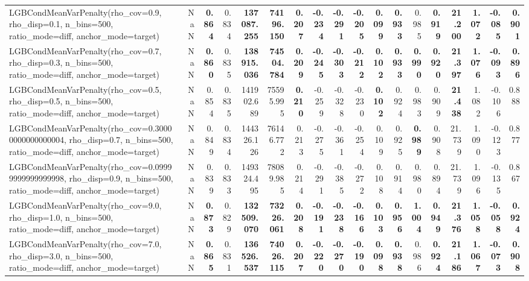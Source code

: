 \documentclass[11pt]{article}
\theoremstyle{plain}
\theoremstyle{definition}
\newcommand{\1}{\mathbf{1}}
\begin{document}
\begin{table}[htbp]
{\begin{tabular}{lrrrrrrrrrrrrrrrrr}
LGBCondMeanVarPenalty(rho\_cov=0.9, rho\_disp=0.1, n\_bins=500, ratio\_mode=diff, anchor\_mode=target) & NaN & \textbf{0.864} & 0.834 & \textbf{137087.255} & \textbf{74196.150} & \textbf{0.207} & \textbf{-0.234} & \textbf{-0.291} & \textbf{-0.205} & \textbf{0.099} & \textbf{0.933} & 0.985 & \textbf{0.919} & \textbf{21.200} & \textbf{1.072} & \textbf{-0.085} & \textbf{0.901} \\
LGBCondMeanVarPenalty(rho\_cov=0.7, rho\_disp=0.3, n\_bins=500, ratio\_mode=diff, anchor\_mode=target) & NaN & \textbf{0.860} & 0.835 & \textbf{138915.036} & \textbf{74504.784} & \textbf{0.209} & \textbf{-0.245} & \textbf{-0.303} & \textbf{-0.212} & \textbf{0.102} & \textbf{0.933} & \textbf{0.990} & \textbf{0.920} & \textbf{21.397} & \textbf{1.076} & \textbf{-0.093} & \textbf{0.896} \\
LGBCondMeanVarPenalty(rho\_cov=0.5, rho\_disp=0.5, n\_bins=500, ratio\_mode=diff, anchor\_mode=target) & NaN & 0.854 & 0.835 & 141902.689 & 75595.995 & \textbf{0.210} & -0.259 & -0.328 & -0.230 & \textbf{0.102} & 0.924 & 0.983 & 0.909 & \textbf{21.438} & 1.082 & -0.106 & 0.888 \\
LGBCondMeanVarPenalty(rho\_cov=0.30000000000000004, rho\_disp=0.7, n\_bins=500, ratio\_mode=diff, anchor\_mode=target) & NaN & 0.849 & 0.834 & 144326.126 & 76146.772 & 0.213 & -0.275 & -0.361 & -0.254 & 0.109 & 0.925 & \textbf{0.989} & 0.908 & 21.739 & 1.090 & -0.123 & 0.877 \\
LGBCondMeanVarPenalty(rho\_cov=0.09999999999999998, rho\_disp=0.9, n\_bins=500, ratio\_mode=diff, anchor\_mode=target) & NaN & 0.839 & 0.833 & 149324.495 & 78089.985 & 0.214 & -0.291 & -0.385 & -0.272 & 0.108 & 0.914 & 0.980 & 0.894 & 21.739 & 1.096 & -0.135 & 0.867 \\
LGBCondMeanVarPenalty(rho\_cov=9.0, rho\_disp=1.0, n\_bins=500, ratio\_mode=diff, anchor\_mode=target) & NaN & \textbf{0.873} & 0.829 & \textbf{132509.070} & \textbf{73226.061} & \textbf{0.208} & \textbf{-0.191} & \textbf{-0.238} & \textbf{-0.166} & \textbf{0.103} & \textbf{0.956} & \textbf{1.004} & \textbf{0.949} & \textbf{21.376} & \textbf{1.058} & \textbf{-0.058} & \textbf{0.924} \\
LGBCondMeanVarPenalty(rho\_cov=7.0, rho\_disp=3.0, n\_bins=500, ratio\_mode=diff, anchor\_mode=target) & NaN & \textbf{0.865} & 0.831 & \textbf{136526.537} & \textbf{74026.115} & \textbf{0.207} & \textbf{-0.220} & \textbf{-0.270} & \textbf{-0.190} & \textbf{0.098} & \textbf{0.938} & 0.986 & \textbf{0.924} & \textbf{21.186} & \textbf{1.067} & \textbf{-0.073} & \textbf{0.908} \\

\end{tabular}}
\end{table}
\end{document}
